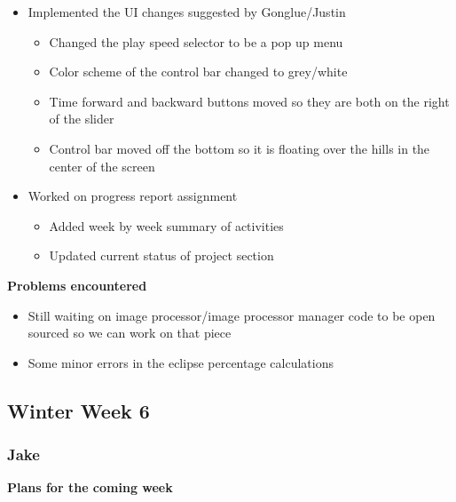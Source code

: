 \documentclass[10pt, onecolumn, draftclsnofoot, letterpaper, compsoc]{IEEEtran}
\begin{document}
    \begin{itemize}

    \item Implemented the UI changes suggested by Gonglue/Justin

    \begin{itemize}
      \item Changed the play speed selector to be a pop up menu
      \item Color scheme of the control bar changed to grey/white
      \item Time forward and backward buttons moved so they are both on the right of the slider
      \item Control bar moved off the bottom so it is floating over the hills in the center of the screen
    \end{itemize}

    \item Worked on progress report assignment

    \begin{itemize}
      \item Added week by week summary of activities
      \item Updated current status of project section
    \end{itemize}

    \end{itemize}

    \noindent \textbf{Problems encountered}

    \begin{itemize}

    \item Still waiting on image processor/image processor manager code to be open sourced so we can work on that piece
    \item Some minor errors in the eclipse percentage calculations

    \end{itemize}

\subsection{Winter Week 6}

    \subsubsection{Jake}

    \noindent \textbf{Plans for the coming week}
\end{document}
